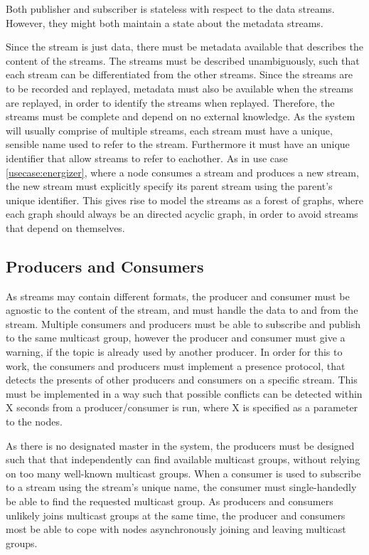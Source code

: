 Both publisher and subscriber is stateless with respect to the data streams. However, they might both maintain a state about the metadata streams.

Since the stream is just data, there must be metadata available that describes the content of the streams. The streams must be described unambiguously, such that each stream can be differentiated from the other streams. Since the streams are to be recorded and replayed, metadata must also be available when the streams are replayed, in order to identify the streams when replayed. Therefore, the streams must be complete and depend on no external knowledge.
As the system will usually comprise of multiple streams, each stream must have a unique, sensible name used to refer to the stream. Furthermore it must have an unique identifier that allow streams to refer to eachother.
As in use case \ref{usecase:energizer}, where a node consumes a stream and produces a new stream, the new stream must explicitly specify its parent stream using the parent's unique identifier. This gives rise to model the streams as a forest of graphs, where each graph should always be an directed acyclic graph, in order to avoid streams that depend on themselves.


\subsection{Producers and Consumers}
As streams may contain different formats, the producer and consumer must be agnostic to the content of the stream, and must handle the data to and from the stream.
Multiple consumers and producers must be able to subscribe and publish to the same multicast group, however the producer and consumer must give a warning, if the topic is already used by another producer. In order for this to work, the consumers and producers must implement a presence protocol, that detects the presents of other producers and consumers on a specific stream. This must be implemented in a way such that possible conflicts can be detected within X seconds from a producer/consumer is run, where X is specified as a parameter to the nodes.

As there is no designated master in the system, the producers must be designed such that that independently can find available multicast groups, without relying on too many well-known multicast groups. When a consumer is used to subscribe to a stream using the stream's unique name, the consumer must single-handedly be able to find the requested multicast group.
As producers and consumers unlikely joins multicast groups at the same time, the producer and consumers most be able to cope with nodes asynchronously joining and leaving multicast groups.

